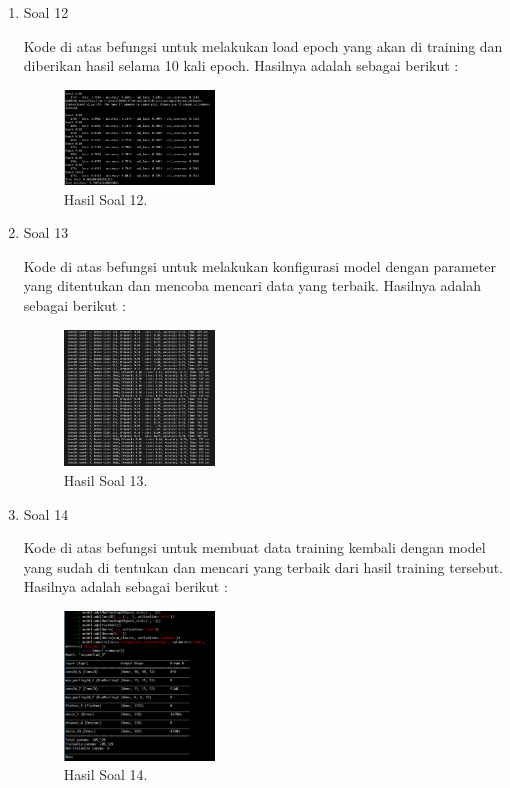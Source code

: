 \begin{enumerate}
	\item Soal 12
	\hfill\break
	
	Kode di atas befungsi untuk melakukan load epoch yang akan di training dan diberikan hasil selama 10 kali epoch. Hasilnya adalah sebagai berikut :  
	\begin{figure}[H]
	\centering
		\includegraphics[width=4cm]{figures/1174021/tugas7/materi/hasil12.PNG}
		\caption{Hasil Soal 12.}
	\end{figure}

	\item Soal 13
	\hfill\break
	
	Kode di atas befungsi untuk melakukan konfigurasi model dengan parameter yang ditentukan dan mencoba mencari data yang terbaik. Hasilnya adalah sebagai berikut :  
	\begin{figure}[H]
	\centering
		\includegraphics[width=4cm]{figures/1174021/tugas7/materi/hasil13.PNG}
		\caption{Hasil Soal 13.}
	\end{figure}

	\item Soal 14
	\hfill\break
	
	Kode di atas befungsi untuk membuat data training kembali dengan model yang sudah di tentukan dan mencari yang terbaik dari hasil training tersebut. Hasilnya adalah sebagai berikut :  
	\begin{figure}[H]
	\centering
		\includegraphics[width=4cm]{figures/1174021/tugas7/materi/hasil14.PNG}
		\caption{Hasil Soal 14.}
	\end{figure}


\end{enumerate}

